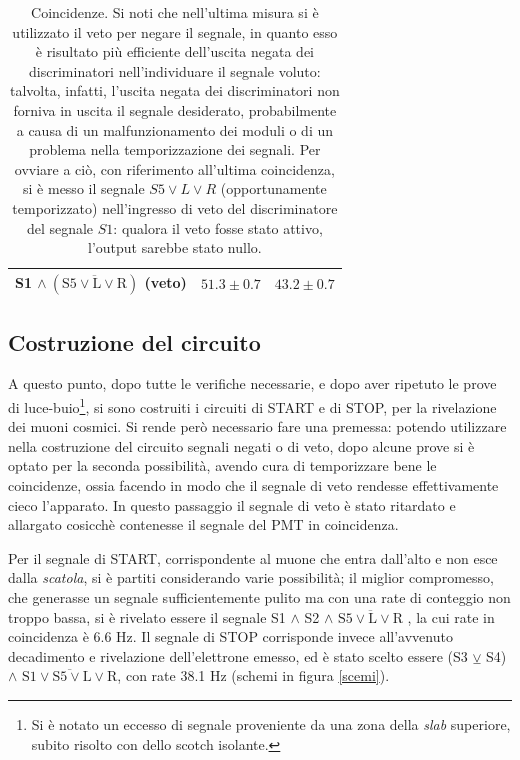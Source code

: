 \documentclass[10pt, oneside, a4paper]{article}   	%
\begin{document}
\begin{table}[H]
\begin{tabular}{ccc}
		S1 $\wedge \ (\overline{\mbox{S5}\vee \mbox{L} \vee \mbox{R}})$ (veto)	& $51.3 \pm 0.7$	& $43.2 \pm 0.7$	\\
		\bottomrule
	\end{tabular}
	\caption{Coincidenze. 
	Si noti che nell'ultima misura si è utilizzato il veto per negare il segnale, 
	in quanto esso è risultato più efficiente dell'uscita negata dei discriminatori 
	nell'individuare il segnale voluto: talvolta, infatti, l'uscita negata dei discriminatori non forniva in uscita il segnale desiderato, 
	probabilmente a causa di un malfunzionamento dei moduli o di un problema nella temporizzazione dei segnali. Per ovviare a ciò, con riferimento all'ultima coincidenza,
	si è messo il segnale $S5\vee L\vee R$ (opportunamente temporizzato)
	nell'ingresso di veto del discriminatore del 
	segnale $S1$: qualora il veto fosse stato attivo, l'output 
	sarebbe stato nullo.}
	\label{coincidenze}
\end{table}
%
\subsection{Costruzione del circuito}
A questo punto, dopo tutte le verifiche necessarie, e dopo aver ripetuto le prove di luce-buio\footnote{Si è notato un eccesso di segnale proveniente da una zona della \emph{slab} superiore, subito risolto con dello scotch isolante.}, si sono costruiti i circuiti di START e di STOP, per la rivelazione dei muoni cosmici. Si rende però necessario fare una premessa: potendo utilizzare nella costruzione del circuito segnali negati o di veto, dopo alcune prove si è optato per la seconda possibilità, avendo cura di temporizzare bene le coincidenze, ossia facendo in modo che il segnale di veto rendesse effettivamente cieco l'apparato. In questo passaggio il segnale di veto è stato ritardato e allargato cosicchè contenesse il segnale del PMT in coincidenza.

Per il segnale di START, corrispondente al muone che entra dall'alto e non esce dalla \emph{scatola}, si è partiti considerando varie possibilità; il miglior compromesso, che generasse un segnale sufficientemente pulito ma con una rate di conteggio non troppo bassa, si è rivelato essere il segnale S1 $\wedge$ S2  $\wedge$ $\overline{\mbox{S5}\vee \mbox{L} \vee \mbox{R}}$ , la cui rate in coincidenza è 6.6 Hz.
Il segnale di STOP corrisponde invece all'avvenuto decadimento e rivelazione dell'elettrone emesso, ed è stato scelto essere (S3 $\veebar$ S4)  $\wedge$ $\overline{\mbox{S1} \vee \mbox{S5}\vee \mbox{L} \vee \mbox{R}}$, con rate 38.1 Hz (schemi in figura \ref{scemi}).
\end{document}
